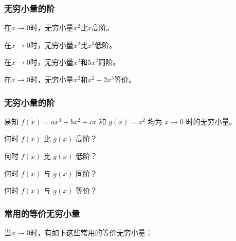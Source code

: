 \documentclass[14pt,notheorems,leqno,xcolor={rgb}]{beamer} %
\begin{document}
\begin{frame}
\frametitle{无穷小量的阶}
\begin{example}
在$x\to0$时，无穷小量$x^2$比$x$高阶。
\end{example}
\vpause
\begin{example}
在$x\to0$时，无穷小量$x^2$比$x^3$低阶。
\end{example}
\vpause
\begin{example}
在$x\to0$时，无穷小量$x^2$和$5x^2$同阶。
\end{example}
\vpause
\begin{example}
在$x\to0$时，无穷小量$x^2$和$x^2+2x^3$等价。
\end{example}
\end{frame}

\begin{iframe}
\frametitle{无穷小量的阶}
\begin{exercise}
易知 $f(x)=ax^3+bx^2+cx$ 和 $g(x)=x^2$ 均为 $x\to0$ 时的无穷小量。
\begin{enumlite}
  \item 何时 $f(x)$ 比 $g(x)$ 高阶？
  \item 何时 $f(x)$ 比 $g(x)$ 低阶？
  \item 何时 $f(x)$ 与 $g(x)$ 同阶？
  \item 何时 $f(x)$ 与 $g(x)$ 等价？
\end{enumlite}
\end{exercise}
\end{iframe}

\begin{frame}
\frametitle{常用的等价无穷小量}
当$x\to0$时，有如下这些常用的等价无穷小量：\\[0.6em]
\noindent{}
\end{frame}
\end{document}
